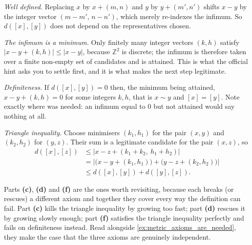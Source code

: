 \begin{exercisesolution}
\begin{enumerate}[label=\textbf{(\alph*)}]
    \textit{Well defined.} Replacing $x$ by $x+(m,n)$ and $y$ by $y+(m',n')$ shifts $x-y$ by the
    integer vector $(m-m',\,n-n')$, which merely re-indexes the infimum. So $d([x],[y])$ does
    not depend on the representatives chosen.

    \textit{The infimum is a minimum.} Only finitely many integer vectors $(k,h)$ satisfy
    $|x-y+(k,h)| \leq |x-y|$, because $\mathbb{Z}^2$ is discrete; the
    infimum is therefore taken over a finite non-empty set of candidates and is attained. This
    is what the official hint asks you to settle first, and it is what makes the next step
    legitimate.

    \textit{Definiteness.} If $d([x],[y]) = 0$ then, the minimum being attained,
    $x-y+(k,h) = 0$ for some integers $k,h$, that is $x \sim y$ and $[x] = [y]$. Note exactly
    where  was needed: an infimum equal to $0$ but not attained
    would say nothing at all.

    \textit{Triangle inequality.} Choose minimisers $(k_1,h_1)$ for the pair $(x,y)$ and
    $(k_2,h_2)$ for $(y,z)$. Their sum is a legitimate candidate for the pair $(x,z)$, so
    \begin{align*}
      d([x],[z]) &\leq \big|x-z+(k_1{+}k_2,\ h_1{+}h_2)\big| \\
      &= \big|\big(x-y+(k_1,h_1)\big) + \big(y-z+(k_2,h_2)\big)\big| \\
      &\leq d([x],[y]) + d([y],[z]).
    \end{align*}
\end{enumerate}
\end{exercisesolution}

\begin{ainote}
Parts \textbf{(c)}, \textbf{(d)} and \textbf{(f)} are the ones worth revisiting, because each
breaks (or rescues) a different axiom and together they cover every way the definition can fail.
Part \textbf{(c)} kills the triangle inequality by growing too fast; part \textbf{(d)} rescues it
by growing slowly enough; part \textbf{(f)} satisfies the triangle inequality perfectly and fails
on definiteness instead. Read alongside
\cref{ex:metric_axioms_are_needed}, they make the case that the three axioms are genuinely
independent.
\end{ainote}


